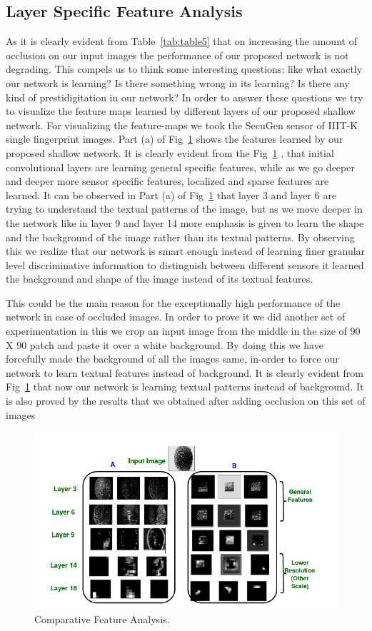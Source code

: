 \documentclass[12pt, a4paper,twoside]{article}
\begin{document}
\subsection{Layer Specific Feature Analysis}
\label{sec:layerSpecificFeature}

	As it is clearly evident from Table~\ref{tab:table5} that on increasing the amount of occlusion on our input images the performance of our proposed network is not degrading. This compels us to think some interesting questions: like what exactly our network is learning? Is there something wrong in its learning? Is there any kind of prestidigitation in our network? In order to answer these questions we try to visualize the feature maps learned by different layers of our proposed shallow network. For visualizing the feature-maps we took the SecuGen sensor of IIIT-K single fingerprint images. Part (a) of Fig~\ref{fig:figure8} shows the features learned by our proposed shallow network. It is clearly evident from the Fig~\ref{fig:figure8} , that initial convolutional layers are learning general specific features, while as we go deeper and deeper more sensor specific features, localized and sparse features are learned. It can be observed in Part (a) of Fig~\ref{fig:figure8} that layer 3 and layer 6 are trying to understand the textual patterns of the image, but as we move deeper in the network like in layer 9 and layer 14 more emphasis is given to learn the shape and the background of the image rather than its textual patterns. By observing this we realize that our network is smart enough instead of learning finer granular level discriminative information to distinguish between different sensors it learned the background and shape of the image instead of its textual features.

	This could be the main reason for the exceptionally high performance of the network in case of occluded images. In order to prove it we did another set of experimentation in this we crop an input image from the middle in the size of 90 X 90 patch and paste it over a white background. By doing this we have forcefully made the background of all the images same, in-order to force our network to learn textual features instead of background. It is clearly evident from Fig~\ref{fig:figure8} that now our network is learning textual patterns instead of background. It is also proved by the results that we obtained after adding occlusion on this set of images

\begin{figure}[htbp]
\centering
\includegraphics[scale=1]{images/FeatureAnalysis}
\caption{ Comparative Feature Analysis.
}\label{fig:figure8}
\end{figure} 
\end{document}

